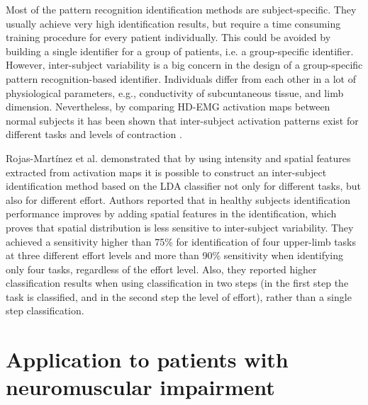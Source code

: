 Most of the pattern recognition identification methods are subject-specific. They usually achieve very high identification results, but require a time consuming training procedure for every patient individually. This could be avoided by building a single identifier for a group of patients, i.e. a group-specific identifier. However, inter-subject variability is a big concern in the design of a group-specific pattern recognition-based identifier. Individuals differ from each other in a lot of physiological parameters, e.g., conductivity of subcuntaneous tissue, and limb dimension. Nevertheless, by comparing HD-EMG activation maps between normal subjects it has been shown that inter-subject activation patterns exist for different tasks and levels of contraction \citep{Rojas-Martinez2012}.

Rojas-Martínez et al. demonstrated that by using intensity and spatial features extracted from activation maps it is possible to construct an inter-subject identification method based on the LDA classifier not only for different tasks, but also for different effort. Authors reported that in healthy subjects identification performance improves by adding spatial features in the identification, which proves that spatial distribution is less sensitive to inter-subject variability. They achieved a sensitivity higher than 75\% for identification of four upper-limb tasks at three different effort levels and more than 90\% sensitivity when identifying only four tasks, regardless of the effort level. Also, they reported higher classification results when using classification in two steps (in the first step the task is classified, and in the second step the level of effort), rather than a single step classification.


\section{Application to patients with neuromuscular impairment}

